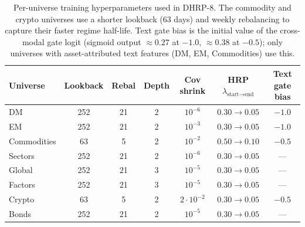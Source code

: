 \begin{table}[h]
\caption{Per-universe training hyperparameters used in DHRP-8. The
commodity and crypto universes use a shorter lookback (63 days) and
weekly rebalancing to capture their faster regime half-life. Text gate
bias is the initial value of the cross-modal gate logit (sigmoid output
$\approx 0.27$ at $-1.0$, $\approx 0.38$ at $-0.5$); only universes with
asset-attributed text features (DM, EM, Commodities) use this.}
\label{tab:hyperparams}
\centering
\small
\begin{tabular}{lcccccc}
\toprule
Universe & Lookback & Rebal & Depth & Cov shrink & HRP $\lambda_{\text{start}\to\text{end}}$ & Text gate bias \\
\midrule
DM           & 252 & 21 & 2 & $10^{-6}$ & $0.30 \to 0.05$ & $-1.0$ \\
EM           & 252 & 21 & 2 & $10^{-3}$ & $0.30 \to 0.05$ & $-1.0$ \\
Commodities  & 63  & 5  & 2 & $10^{-2}$ & $0.50 \to 0.10$ & $-0.5$ \\
Sectors      & 252 & 21 & 2 & $10^{-6}$ & $0.30 \to 0.05$ & --- \\
Global       & 252 & 21 & 3 & $10^{-5}$ & $0.30 \to 0.05$ & --- \\
Factors      & 252 & 21 & 3 & $10^{-5}$ & $0.30 \to 0.05$ & --- \\
Crypto       & 63  & 5  & 2 & $2{\cdot}10^{-2}$ & $0.30 \to 0.05$ & $-0.5$ \\
Bonds        & 252 & 21 & 2 & $10^{-5}$ & $0.30 \to 0.05$ & --- \\
\bottomrule
\end{tabular}
\end{table}

